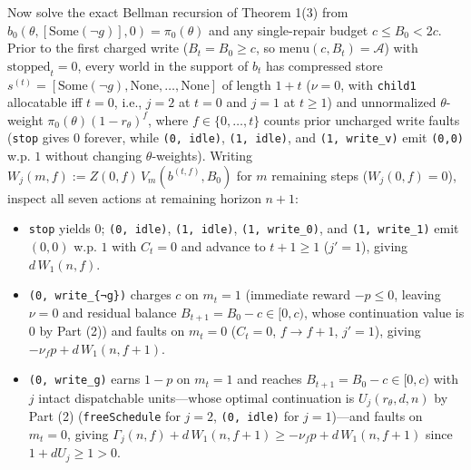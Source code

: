\documentclass[11pt,letterpaper]{article}
\providecommand{\tightlist}{\setlength{\itemsep}{2pt}\setlength{\parskip}{0pt}}
\begin{document}
Now solve the exact Bellman recursion of Theorem 1(3) from
\(b_0(\theta, [\mathrm{Some}(\neg g)], 0) = \pi_0(\theta)\) and any
single-repair budget \(c \le B_0 < 2c\). Prior to the first charged
write (\(B_t = B_0 \ge c\), so \(\mathrm{menu}(c, B_t) = \mathcal{A}\))
with \(\mathrm{stopped}_t = 0\), every world in the support of \(b_t\)
has compressed store
\(s^{(t)} = [\mathrm{Some}(\neg g), \mathrm{None}, \dots, \mathrm{None}]\)
of length \(1 + t\) (\(\nu = 0\), with \texttt{child1} allocatable iff
\(t = 0\), i.e., \(j = 2\) at \(t=0\) and \(j = 1\) at \(t \ge 1\)) and
unnormalized \(\theta\)-weight \(\pi_0(\theta)(1 - r_\theta)^f\), where
\(f \in \{0, \dots, t\}\) counts prior uncharged write faults
(\texttt{stop} gives \(0\) forever, while \texttt{(0,\ idle)},
\texttt{(1,\ idle)}, and \texttt{(1,\ write\_v)} emit \texttt{(0,0)}
w.p. \(1\) without changing \(\theta\)-weights). Writing
\(W_j(m, f) := Z(0, f)\,V_m(b^{(t,f)}, B_0)\) for \(m\) remaining steps
(\(W_j(0, f) = 0\)), inspect all seven actions at remaining horizon
\(n + 1\):

\begin{itemize}
\tightlist
\item
  \texttt{stop} yields \(0\); \texttt{(0,\ idle)}, \texttt{(1,\ idle)},
  \texttt{(1,\ write\_0)}, and \texttt{(1,\ write\_1)} emit \((0,0)\)
  w.p. \(1\) with \(C_t = 0\) and advance to \(t + 1 \ge 1\)
  (\(j' = 1\)), giving \(d\,W_1(n, f)\).
\item
  \texttt{(0,\ write\_\{¬g\})} charges \(c\) on \(m_t = 1\) (immediate
  reward \(-p \le 0\), leaving \(\nu = 0\) and residual balance
  \(B_{t+1} = B_0 - c \in [0, c)\), whose continuation value is \(0\) by
  Part (2)) and faults on \(m_t = 0\) (\(C_t = 0\), \(f \to f+1\),
  \(j' = 1\)), giving \(-\nu_f p + d\,W_1(n, f+1)\).
\item
  \texttt{(0,\ write\_g)} earns \(1 - p\) on \(m_t = 1\) and reaches
  \(B_{t+1} = B_0 - c \in [0, c)\) with \(j\) intact dispatchable
  units---whose optimal continuation is \(U_j(r_\theta, d, n)\) by Part
  (2) (\texttt{freeSchedule} for \(j=2\), \texttt{(0,\ idle)} for
  \(j=1\))---and faults on \(m_t = 0\), giving
  \(\Gamma_j(n, f) + d\,W_1(n, f+1) \ge -\nu_f p + d\,W_1(n, f+1)\)
  since \(1 + d U_j \ge 1 > 0\).
\end{itemize}
\end{document}
